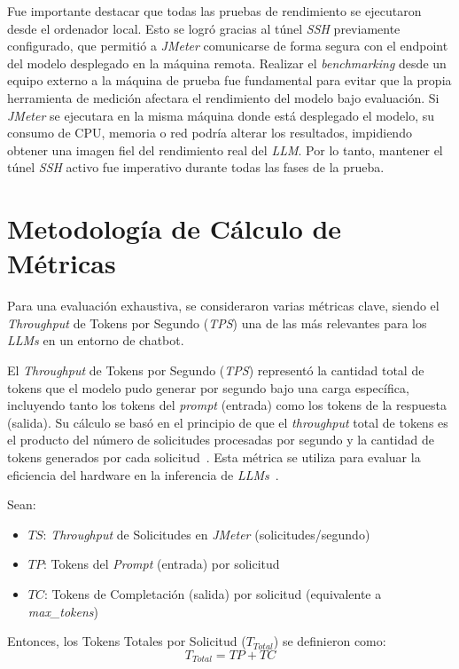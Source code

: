 Fue importante destacar que todas las pruebas de rendimiento se ejecutaron desde el ordenador local. Esto se logró gracias al túnel \textit{SSH} previamente configurado, que permitió a \textit{JMeter} comunicarse de forma segura con el endpoint del modelo desplegado en la máquina remota. Realizar el \textit{benchmarking} desde un equipo externo a la máquina de prueba fue fundamental para evitar que la propia herramienta de medición afectara el rendimiento del modelo bajo evaluación. Si \textit{JMeter} se ejecutara en la misma máquina donde está desplegado el modelo, su consumo de CPU, memoria o red podría alterar los resultados, impidiendo obtener una imagen fiel del rendimiento real del \textit{LLM}. Por lo tanto, mantener el túnel \textit{SSH} activo fue imperativo durante todas las fases de la prueba.

\section{Metodología de Cálculo de Métricas}
Para una evaluación exhaustiva, se consideraron varias métricas clave, siendo el \textit{Throughput} de Tokens por Segundo (\textit{TPS}) una de las más relevantes para los \textit{LLMs} en un entorno de chatbot.

El \textit{Throughput} de Tokens por Segundo (\textit{TPS}) representó la cantidad total de tokens que el modelo pudo generar por segundo bajo una carga específica, incluyendo tanto los tokens del \textit{prompt} (entrada) como los tokens de la respuesta (salida). Su cálculo se basó en el principio de que el \textit{throughput} total de tokens es el producto del número de solicitudes procesadas por segundo y la cantidad de tokens generados por cada solicitud~\cite{ref29,ref30}. Esta métrica se utiliza para evaluar la eficiencia del hardware en la inferencia de \textit{LLMs}~\cite{ref31}.

Sean:
\begin{itemize}
    \item $TS$: \textit{Throughput} de Solicitudes en \textit{JMeter} (solicitudes/segundo)
    \item $TP$: Tokens del \textit{Prompt} (entrada) por solicitud
    \item $TC$: Tokens de Completación (salida) por solicitud (equivalente a \textit{max\_tokens})
\end{itemize}
Entonces, los Tokens Totales por Solicitud ($T_{Total}$) se definieron como:
\begin{equation*}
T_{Total} = TP + TC
\end{equation*}

